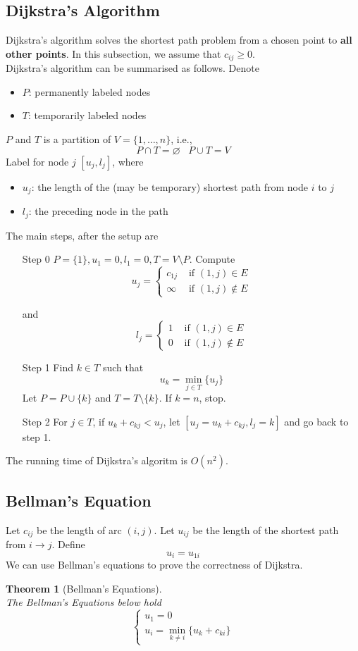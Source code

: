 \documentclass[12pt]{article}
\newtheorem{theorem}{Theorem}[section]
\theoremstyle{definition}
\begin{document}
\subsection{Dijkstra's Algorithm}
Dijkstra's algorithm solves the shortest path problem from a chosen point to \textbf{all other points}. In this subsection, we assume that $c_{ij}\geq 0$.\\
Dijkstra's algorithm can be summarised as follows. Denote
\begin{itemize}
  \item $P$: permanently labeled nodes
  \item $T$: temporarily labeled nodes
\end{itemize}
$P$ and $T$ is a partition of $V=\{1,\ldots, n\}$, i.e.,
\[
P\cap T=\varnothing\;\;\;P\cup T=V
\]
Label for node $j$ $[u_j,l_j]$, where
\begin{itemize}
  \item $u_j$: the length of the (may be temporary) shortest path from node $i$ to $j$
  \item $l_j$: the preceding node in the path
\end{itemize}
The main steps, after the setup are
\begin{itemize}
  \item[Step 0] $P=\{1\}, u_1=0, l_1=0, T=V\setminus P$. Compute
  \[
u_j=\begin{cases}
c_{1j}&\text{ if }(1,j)\in E\\
\infty & \text{ if }(1,j)\not\in E
\end{cases}
  \]

and
\[
l_j=\begin{cases}
1&\text{ if }(1,j)\in E\\
0 & \text{ if }(1,j)\not\in E
\end{cases}
\]
\item[Step 1] Find $k\in T$ such that
\[
u_k = \min_{j\in T} \{u_j\}
\]
Let $P=P\cup \{k\}$ and $T=T\setminus\{k\}$. If $k=n$, stop.
\item[Step 2] For $j\in T$, if $u_k+c_{kj}<u_j$, let $[u_j=u_k+c_{kj}, l_j=k]$ and go back to step 1.
\end{itemize}
The running time of Dijkstra's algoritm is $O(n^2)$.
\subsection{Bellman's Equation}
Let $c_{ij}$ be the length of arc $(i,j)$. Let $u_{ij}$ be the length of the shortest path from $i\to j$. Define
\[
u_{i} = u_{1i}
\]
We can use Bellman's equations to prove the correctness of Dijkstra.
\begin{theorem}[Bellman's Equations]
\hfill\\\normalfont The Bellman's Equations below hold
\[
\begin{cases}
u_1=0\\
u_i=\min_{k\neq i}\{u_k+c_{ki}\}
\end{cases}
\]
\end{theorem}
\end{document}
